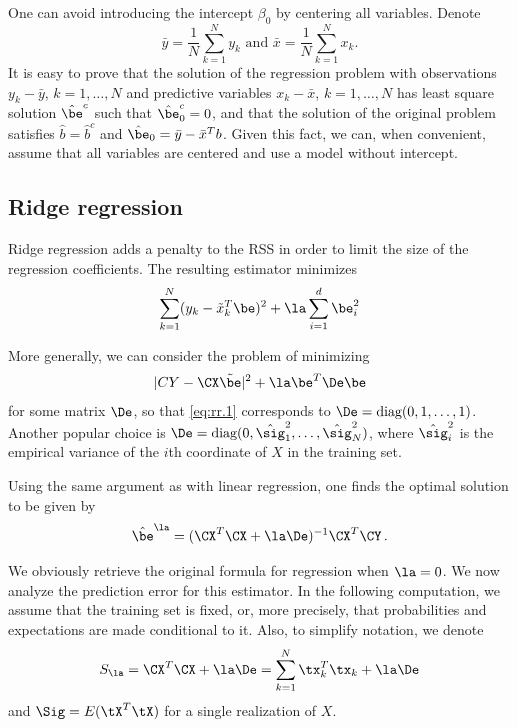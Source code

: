 One can avoid introducing the intercept $\beta_0$ by centering all variables.
Denote 
$$\bar y = \frac{1}{N} \sum_{k=1}^N y_k \text{ and } \bar x =
\frac{1}{N} \sum_{k=1}^N x_k.
$$
It is easy to prove that the solution of the regression problem with  
observations $y_k-\bar y$, $k=1, \ldots, N$ and predictive variables
$x_k-\bar x$, $k=1, \ldots, N$ has least square solution $\hat\be^c$
such that  $\hat\be^c_0 =
0$, and that the solution of the original problem satisfies $\hat b
= \hat b^c$ and $\hat \be_0 = \bar y - \bar x^T b$. Given this fact,
we can, when convenient, assume that all variables are centered and
use a model without intercept.


\subsection{Ridge regression}

Ridge regression adds a penalty to the RSS in order to limit the size of the regression coefficients. The resulting estimator minimizes
\begin{equation}
\label{eq:rr.1}
\sum_{k=1}^N (y_k - \tilde x_k^T \be)^2 + \la \sum_{i=1}^d \be_i^2
\end{equation}

More generally, we can consider the problem of minimizing 
$$
|CY - \CX\tilde\be|^2 + \la \be^T\De\be
$$
for some matrix $\De$, so that \eqref{eq:rr.1} corresponds to
$\De = \text{diag}(0, 1, \ldots, 1)$.  Another popular choice is 
$\De = \text{diag}(0, \hat\sig^2_1, \ldots, \hat\sig^2_N)$, where $\hat\sig_i^2$ is the empirical variance of the $i$th coordinate of $X$ in the training set.

Using the same argument as with
linear regression, one finds the optimal solution to be given by
$$
\hat\be^\la = (\CX^T\CX + \la \De)^{-1}\CX^T \CY\,.
$$


We obviously retrieve the original formula for regression when
$\la=0$. We now analyze the prediction error for this estimator. In the
following computation, we assume that the training set is fixed, or,
more precisely, that probabilities and expectations are made
conditional to it.
Also, to simplify notation, we
denote
$$
S_\la = \CX^T\CX + \la \De = \sum_{k=1}^N \tx_k^T\tx_k + \la\De
$$
and 
$\Sig = E(\tX^T\tX)$ for a single realization of $X$. 

